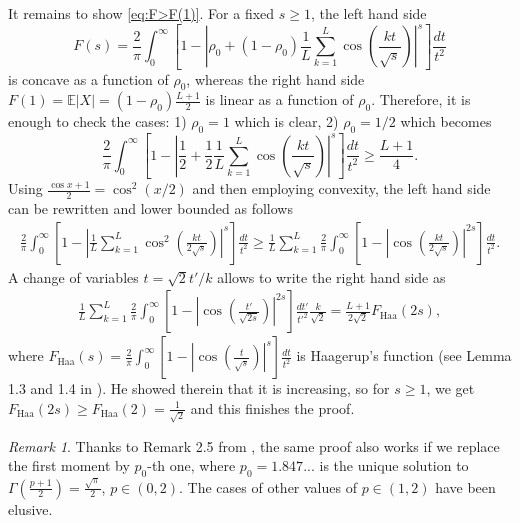 \documentclass[10pt]{article}
\newcommand{\E}{\mathbb{E}}
\newcommand{\1}{\textbf{1}}
\theoremstyle{remark}
\newtheorem{remark}[theorem]{Remark}
\theoremstyle{definition}
\begin{document}
It remains to show \eqref{eq:F>F(1)}. For a fixed $s \geq 1$, the left hand side
\[
F(s) = \frac{2}{\pi}\int_0^\infty\left[1 - \left|\rho_0 + (1-\rho_0)\frac{1}{L}\sum_{k=1}^L \cos\left(\frac{kt}{\sqrt{s}}\right)\right|^s\right]\frac{dt}{t^2}
\]
is concave as a function of $\rho_0$, whereas the right hand side $F(1) = \E|X| = (1-\rho_0)\frac{L+1}{2}$ is linear as a function of $\rho_0$. Therefore, it is enough to check the cases: 1) $\rho_0 = 1$ which is clear, 2) $\rho_0 = 1/2$ which becomes
\[
\frac{2}{\pi}\int_0^\infty\left[1 - \left|\frac{1}{2} + \frac{1}{2}\frac{1}{L}\sum_{k=1}^L \cos\left(\frac{kt}{\sqrt{s}}\right)\right|^s\right]\frac{dt}{t^2} \geq \frac{L+1}{4}.
\]
Using $\frac{\cos x +1}{2} = \cos^2(x/2)$ and then employing convexity, the left hand side can be rewritten and lower bounded as follows
\begin{align*}
\frac{2}{\pi}\int_0^\infty\left[1 - \left|\frac{1}{L}\sum_{k=1}^L \cos^2\left(\frac{kt}{2\sqrt{s}}\right)\right|^s\right]\frac{dt}{t^2} \geq \frac{1}{L}\sum_{k=1}^L\frac{2}{\pi}\int_0^\infty\left[1 - \left|\cos\left(\frac{kt}{2\sqrt{s}}\right)\right|^{2s}\right]\frac{dt}{t^2}.
\end{align*}
A change of variables $t = \sqrt{2}t'/k$ allows to write the right hand side as
\begin{align*}
\frac{1}{L}\sum_{k=1}^L\frac{2}{\pi}\int_0^\infty\left[1 - \left|\cos\left(\frac{t'}{\sqrt{2s}}\right)\right|^{2s}\right]\frac{dt'}{t'^2}\frac{k}{\sqrt{2}} = \frac{L+1}{2\sqrt{2}}F_{\text{Haa}}(2s),
\end{align*}
where $F_{\text{Haa}}(s) = \frac{2}{\pi}\int_0^\infty\left[1 - \left|\cos\left(\frac{t}{\sqrt{s}}\right)\right|^{s}\right]\frac{dt}{t^2}$ is Haagerup's function (see Lemma 1.3 and 1.4 in \cite{Haa}). He showed therein that it is increasing, so for $s \geq 1$, we get $F_{\text{Haa}}(2s) \geq F_{\text{Haa}}(2) = \frac{1}{\sqrt{2}}$ and this finishes the proof.


\begin{remark}\label{rem:L1-L2-otherp}
Thanks to Remark 2.5 from \cite{Haa}, the same proof also works if we replace the first moment by $p_0$-th one, where $p_0 = 1.847...$ is the unique solution to $\Gamma(\frac{p+1}{2}) = \frac{\sqrt{\pi}}{2}$, $p \in (0,2)$. The cases of other values of $p \in (1,2)$ have been elusive. 
\end{remark}

\nocite{*}
\end{document}
